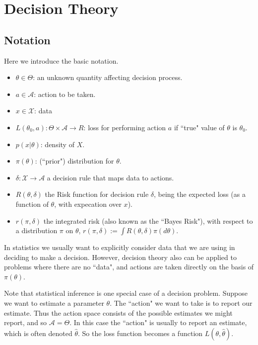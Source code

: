 \documentclass[12pt]{article}
\def\A{\mathcal A}
\def\X{\mathcal X}
\begin{document}
\normalsize

\section{Decision Theory}

\subsection{Notation}

Here we introduce the basic notation.
\begin{itemize}
\item $\theta \in \Theta$: an unknown quantity affecting decision process.
\item $a \in \A$: action to be taken.
\item $x \in \X$: data
\item $L(\theta_0, a): \Theta \times \A \rightarrow R$: loss for performing action $a$ if ``true" value of $\theta$ is $\theta_0$. 
\item $p(x | \theta)$: density of $X$.
\item $\pi(\theta)$: (``prior") distribution for $\theta$.
\item $\delta: \X \rightarrow \A$ a decision rule that maps data to actions.
\item $R(\theta,\delta)$ the Risk function for decision rule $\delta$, being the expected loss (as a function of $\theta$, with expecation over $x$).
\item $r(\pi, \delta)$ the integrated risk (also known as the ``Bayes Risk"), with respect to a distribution $\pi$ on $\theta$, $r(\pi,\delta) := \int R(\theta,\delta) \pi(d\theta)$.
\end{itemize}

In statistics we usually want to explicitly consider 
data that we are using in deciding
to make a decision. However, decision theory also can be
applied to problems where there are no ``data", and actions are taken directly
on the basis of $\pi(\theta)$.

Note that statistical inference is one special case of
a decision problem. Suppose we want to estimate a parameter $\theta$.
The ``action" we want to take is to report our estimate. 
Thus the action space consists of the possible estimates we might report,
and so $\A=\Theta$. In this case the ``action" is usually to report an estimate, which is often denoted $\hat\theta$.
So the loss function becomes a function $L(\theta,\hat\theta)$.
\end{document}
